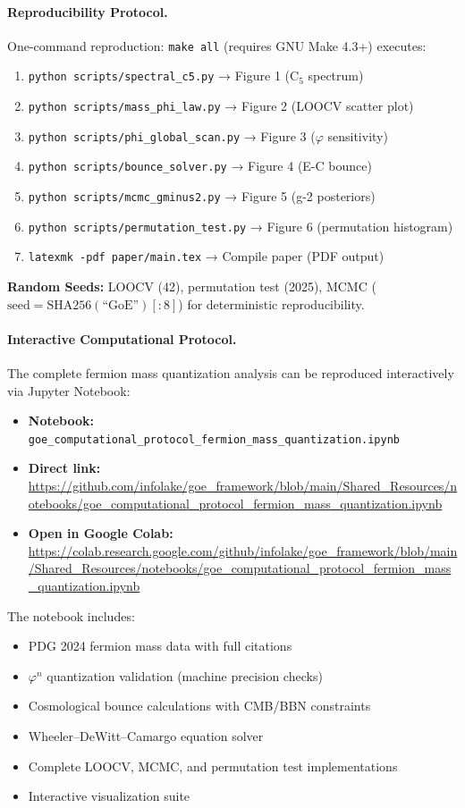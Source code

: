 \documentclass[12pt]{article}
\theoremstyle{definition}
\theoremstyle{plain}
\begin{document}
\paragraph{Reproducibility Protocol.}
One-command reproduction: \texttt{make all} (requires GNU Make 4.3+) executes:
\begin{enumerate}
\item \texttt{python scripts/spectral\_c5.py} → Figure 1 (C$_5$ spectrum)
\item \texttt{python scripts/mass\_phi\_law.py} → Figure 2 (LOOCV scatter plot)
\item \texttt{python scripts/phi\_global\_scan.py} → Figure 3 ($\varphi$ sensitivity)
\item \texttt{python scripts/bounce\_solver.py} → Figure 4 (E-C bounce)
\item \texttt{python scripts/mcmc\_gminus2.py} → Figure 5 (g-2 posteriors)
\item \texttt{python scripts/permutation\_test.py} → Figure 6 (permutation histogram)
\item \texttt{latexmk -pdf paper/main.tex} → Compile paper (PDF output)
\end{enumerate}

\noindent\textbf{Random Seeds:} LOOCV (42), permutation test (2025), MCMC ($\text{seed} = \text{SHA256}(\text{``GoE''})[:8]$) for deterministic reproducibility.

\paragraph{Interactive Computational Protocol.}
The complete fermion mass quantization analysis can be reproduced interactively via Jupyter Notebook:

\begin{itemize}
\item \textbf{Notebook:} \texttt{goe\_computational\_protocol\_fermion\_mass\_quantization.ipynb}
\item \textbf{Direct link:} \url{https://github.com/infolake/goe_framework/blob/main/Shared_Resources/notebooks/goe_computational_protocol_fermion_mass_quantization.ipynb}
\item \textbf{Open in Google Colab:} \url{https://colab.research.google.com/github/infolake/goe_framework/blob/main/Shared_Resources/notebooks/goe_computational_protocol_fermion_mass_quantization.ipynb}
\end{itemize}

\noindent The notebook includes:
\begin{itemize}
\item PDG 2024 fermion mass data with full citations
\item $\varphi^n$ quantization validation (machine precision checks)
\item Cosmological bounce calculations with CMB/BBN constraints
\item Wheeler--DeWitt--Camargo equation solver
\item Complete LOOCV, MCMC, and permutation test implementations
\item Interactive visualization suite
\end{itemize}
\end{document}
